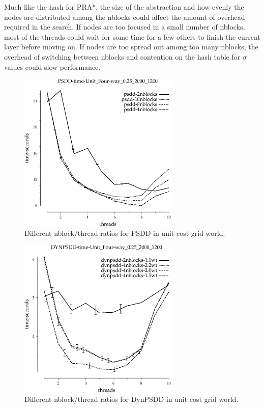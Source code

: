 \documentclass{article}
\begin{document}
Much like the hash for PRA*, the size of the abstraction and how evenly the nodes are distributed among the nblocks could affect the amount of overhead required in the search. If nodes are too focused in a small number of nblocks, most of the threads could wait for some time for a few others to finish the current layer before moving on. If nodes are too spread out among too many nblocks, the overhead of switching between nblocks and contention on the hash table for $\sigma$ values could slow performance.

\begin{figure}[h!]
\includegraphics[width=3in]{../graphs/grid_unit_four-way_0.25_2000_1200/PSDD-time-Unit_Four-way_0.25_2000_1200.eps}
\caption{Different nblock/thread ratios for PSDD in unit cost grid world.}
\label{fig:PSDD-nblock-grid}
\end{figure}

\begin{figure}[h!]
\includegraphics[width=3in]{../graphs/grid_unit_four-way_0.25_2000_1200/DynPSDD-time-Unit_Four-way_0.25_2000_1200.eps}
\caption{Different nblock/thread ratios for DynPSDD in unit cost grid world.}
\label{fig:DynPSDD-nblock-grid}
\end{figure}
\end{document}
